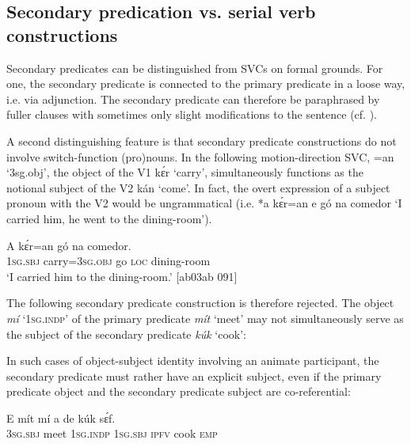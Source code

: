 \subsection{Secondary predication vs. serial verb constructions}

Secondary predicates can be distinguished from SVCs on formal grounds. For one, the secondary predicate is connected to the primary predicate in a loose way, i.e. via adjunction. The secondary predicate can therefore be paraphrased by fuller clauses with sometimes only slight modifications to the sentence (cf. ).


A second distinguishing feature is that secondary predicate constructions do not involve switch-function (pro)nouns{\fff}. In the following motion-direction SVC, =an ‘3sg.obj’, the object of the V1 kɛ́r ‘carry’, simultaneously functions as the notional subject of the V2 kán ‘come’. In fact, the overt expression of a subject{\fff} pronoun with the V2 would be ungrammatical (i.e. *a kɛ́r=an e gó na comedor ‘I carried him, he went to the dining-room’). 



\ea%
    \label{ex:key:1586}
    \gll A    kɛ́r=an      gó  na  comedor.\\
\textsc{1sg.sbj}  carry=\textsc{3sg.obj}    go  \textsc{loc}  dining-room\\

\glt ‘I carried him to the dining-room.’ [ab03ab 091]
\z

The following secondary predicate construction is therefore rejected. The object \textit{mí} ‘\textsc{1sg.indp}’ of the primary predicate \textit{mít} ‘meet’ may not simultaneously serve as the subject of the secondary predicate \textit{kúk} ‘cook’:


\z

In such cases of object-subject identity involving an animate participant, the secondary predicate must rather have an explicit subject, even if the primary predicate object and the secondary predicate subject are co-referential: 


\ea%
    \label{ex:key:1588}
    \gll E    mít    mí    a    de  kúk    sɛ́f.\\
\textsc{3sg.sbj}  meet  \textsc{1sg.indp}  \textsc{1sg.sbj}  \textsc{ipfv}  cook  \textsc{emp}\\

